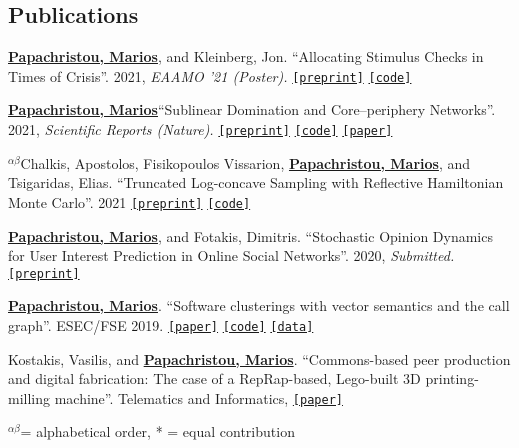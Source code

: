 \documentclass[margin, 10pt]{res}
\newcommand{\alphabeticalorder}[0]{\ensuremath {^{\alpha \beta}}}
\newcommand{\specialurl}[2]{\href { #2 } {\nolinkurl{[#1]}}}
\newcommand{\preprint}[1]{\specialurl {preprint} {#1}}
\newcommand{\code}[1]{\specialurl {code} {#1}}
\newcommand{\data}[1]{\specialurl {data} {#1}}
\newcommand{\paper}[1]{\specialurl {paper} {#1}}
\newcommand{\authorref}[1]{\underline {\textbf{#1}}}
\newcommand{\authorme}{\authorref{Papachristou, Marios}}
\begin{document}
\begin{resume}
\section{Publications}

\begin{compactenum}
    
   \item  \authorme, and Kleinberg, Jon. ``Allocating Stimulus Checks in Times of Crisis''. 2021, \emph{EAAMO '21 (Poster).} \preprint{https://arxiv.org/abs/2106.07560} \code{https://github.com/papachristoumarios/financial-contagion}     
   \item \authorme ``Sublinear Domination and Core--periphery Networks''. 2021,  \emph{Scientific Reports (Nature).}  \preprint{https://arxiv.org/abs/2103.03135} \code{https://bit.ly/3wKNGI0} \paper{http://www.nature.com/articles/s41598-021-94105-8}
    \item \alphabeticalorder Chalkis, Apostolos, Fisikopoulos Vissarion, \authorme, and Tsigaridas, Elias. ``Truncated Log-concave Sampling with Reflective Hamiltonian Monte Carlo''. 2021 \preprint{https://arxiv.org/abs/2102.13068} \code{https://github.com/GeomScale/volume_approximation}
    \item \authorme, and Fotakis, Dimitris. ``Stochastic Opinion Dynamics for User Interest Prediction in Online Social Networks''. 2020, \emph{Submitted.}  \preprint{https://www.researchgate.net/publication/353006940_Stochastic_Opinion_Dynamics_for_Interest_Prediction_in_Social_Networks}
    \item \authorme. ``Software clusterings with vector semantics and the call graph''. ESEC/FSE 2019.  \paper{https://dl.acm.org/citation.cfm?id=3342483} \code{https://github.com/papachristoumarios/sade} \data{http://doi.org/10.5281/zenodo.2652487}
    \item Kostakis, Vasilis, and \authorme. ``Commons-based peer production and digital fabrication: The case of a RepRap-based, Lego-built 3D printing-milling machine''. Telematics and Informatics,  \paper{https://bit.ly/2JRoisV} 
    
\end{compactenum}

\alphabeticalorder  = alphabetical order, * = equal contribution


\end{resume}
\end{document}

